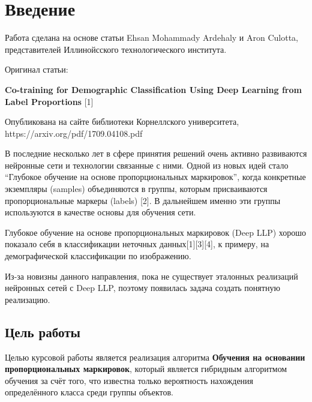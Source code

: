 \documentclass[12pt,a4paper]{article}
\begin{document}
\restoregeometry

\setlength{\jot}{20pt}
\setlength{\parskip}{1em}
\setlength{\mathindent}{1cm}


\sloppypar


\tableofcontents{}





\newpage{}
\section{Введение}

Работа сделана на основе статьи Ehsan Mohammady Ardehaly и Aron
Culotta, представителей Иллинойсского технологического института.

Оригинал статьи:

\textbf{Co-training for Demographic Classification Using Deep Learning from
Label Proportions} [1]

Опубликована на сайте библиотеки Корнеллского университета, https://arxiv.org/pdf/1709.04108.pdf

В последние несколько лет в сфере принятия решений очень активно
развиваются нейронные сети и технологии связанные с ними. Одной из
новых идей стало ``Глубокое обучение на основе пропорциональных
маркировок'', когда конкретные экземпляры (samples) объединяются в
группы, которым присваиваются пропорциональные маркеры (labels) [2]. В
дальнейшем именно эти группы используются в качестве основы для
обучения сети.

Глубокое обучение на основе пропорциональных маркировок (Deep LLP)
хорошо показало себя в классификации неточных данных[1][3][4], к
примеру, на демографической классификации по изображению.

Из-за новизны данного направления, пока не существует эталонных
реализаций нейронных сетей с Deep LLP, поэтому появилась задача
создать понятную реализацию.

\newpage
\subsection{Цель работы}

Целью курсовой работы является реализация алгоритма \textbf{Обучения
  на основании пропорциональных маркировок}, который является
гибридным алгоритмом обучения за счёт того, что известна только
вероятность нахождения определённого класса среди группы объектов.
\end{document}
